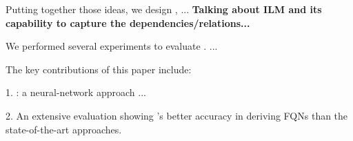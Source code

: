 
Putting together those ideas, we design {\tool}, ...  {\bf Talking
  about ILM and its capability to capture the
  dependencies/relations...}

We performed several experiments to evaluate {\tool}. ...

The key contributions of this paper include:

1. {\tool}: a neural-network approach ...

2. An extensive evaluation showing {\tool}'s better accuracy in
deriving FQNs than the state-of-the-art approaches.

